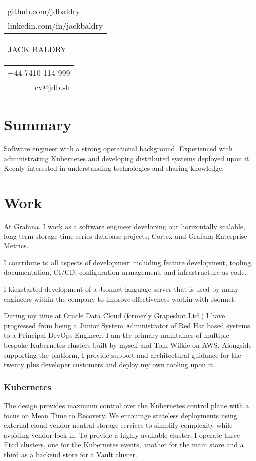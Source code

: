 \documentclass{cv}
\begin{document}
{\small\begin{tabular}{l}
  github.com/jdbaldry \\
  linkedin.com/in/jackbaldry
\end{tabular}}\hfill%
{\LARGE\bfseries\begin{tabular}{l}
  JACK BALDRY
\end{tabular}}\hfill%
{\small\begin{tabular}{r}
  +44 7410 114 999 \\
  cv@jdb.sh
\end{tabular}}%

\section{Summary}
Software engineer with a strong operational background.
Experienced with administrating Kubernetes and developing distributed systems deployed upon it.
Keenly interested in understanding technologies and sharing knowledge.

\section{Work}

At Grafana, I work as a software engineer developing our horizontally scalable, long-term storage time series database projects; Cortex and Grafana Enterprise Metrics.

I contribute to all aspects of development including feature development, tooling, documentation, CI/CD, configuration management, and infrastructure as code.

I kickstarted development of a Jsonnet language server that is used by many engineers within the company to improve effectiveness workin with Jsonnet.


During my time at Oracle Data Cloud (formerly Grapeshot Ltd.) I have progressed from being a Junior System Administrator of Red Hat based systems to a Principal DevOps Engineer. I am the primary maintainer of multiple bespoke Kubernetes clusters built by myself and Tom Wilkie on AWS. Alongside supporting the platform, I provide support and architectural guidance for the twenty plus developer customers and deploy my own tooling upon it.

\subsubsection{Kubernetes}
The design provides maximum control over the Kubernetes control plane with a focus on Mean Time to Recovery. We encourage stateless deployments using external cloud vendor neutral storage services to simplify complexity while avoiding vendor lock-in. To provide a highly available cluster, I operate three Etcd clusters, one for the Kubernetes events, another for the main store and a third as a backend store for a Vault cluster. 
\end{document}
